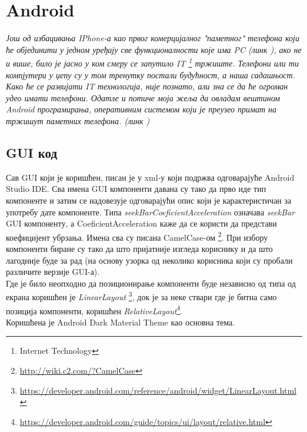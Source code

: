 \chapter{Android}\label{Android}

\emph{Још од избацивања IPhone-а као првог комерцијалног "паметног" телефона који ће објединити у једном уређају све функционалности  које има PC (линк \cite{IPHONE}), ако не и више, било је јасно у ком смеру се запутило IT \footnote{ Internet Technology} тржиште. Телефони или ти компјутери у џепу су у том тренутку постали будућност, а наша садашњост. Како ће се развијати IT технологија, није познато, али зна се да ће огроман удео имати телефони. Одатле и потиче моја  жеља да овладам вештином Android програмирања, оперативним системом који је преузео примат на тржишут паметних телефона. (линк \cite{MarkShare}) }
\section{GUI код}
Сав GUI који је коришћен, писан је у xml-у који подржва одговарајуће Android Studio IDE. Сва имена GUI компоненти давана су тако да прво иде тип компоненте и затим се надовезује одговарајући опис који је карактеристичан за употребу дате компоненте. Типа \emph{seekBarCoeficientAcceleration} означава \emph{seekBar} GUI компоненту, а CoeficientAcceleration каже да се користи да представи коефицијент убрзања. Имена сва су писана CamelCase-ом \footnote{\url{http://wiki.c2.com/?CamelCase}}. При избору компоненти биране су тако да што пријатније изгледа кориснику и да што лагодније буде за рад (на основу узорка од неколико корисника који су пробали различите верзије GUI-а). 
\\ \indent 
Где је било неопходно да позиционирање компоненти буде независно од типа од екрана коришћен је \emph{LinearLayout}
\footnote{\url{https://developer.android.com/reference/android/widget/LinearLayout.html}}, 
док је за неке ствари где је битна само позиција компоненти, коришћен \emph{RelativeLayout}\footnote{\url{https://developer.android.com/guide/topics/ui/layout/relative.html}}.
\\ \indent 
Коришћена је Android Dark Material Theme као основна тема.

